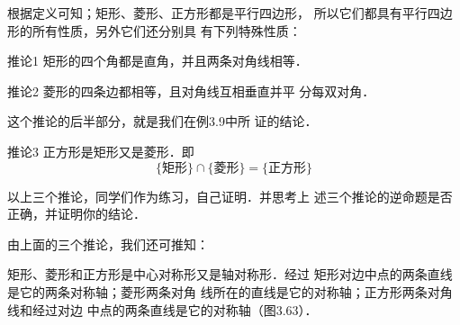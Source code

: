 根据定义可知；矩形、菱形、正方形都是平行四边形，
所以它们都具有平行四边形的所有性质，另外它们还分别具
有下列特殊性质：

\begin{blk}
    {推论1} 矩形的四个角都是直角，并且两条对角线相等．
\end{blk}

\begin{blk}
{推论2} 菱形的四条边都相等，且对角线互相垂直并平
分每双对角．
\end{blk}

这个推论的后半部分，就是我们在例3.9中所
证的结论．

\begin{blk}
    {推论3} 正方形是矩形又是菱形．即
\[\{\text{矩形}\}\cap \{\text{菱形}\}=\{\text{正方形}\}\]
\end{blk}

以上三个推论，同学们作为练习，自己证明．并思考上
述三个推论的逆命题是否正确，并证明你的结论．

由上面的三个推论，我们还可推知：

矩形、菱形和正方形是中心对称形又是轴对称形．经过
矩形对边中点的两条直线是它的两条对称轴；菱形两条对角
线所在的直线是它的对称轴；正方形两条对角线和经过对边
中点的两条直线是它的对称轴（图3.63）．

\begin{figure}[htp]
    \centering
{}
    \caption{}
\end{figure}

